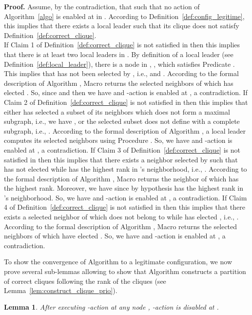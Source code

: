 \documentclass[11pt,letterpaper,onecolumn]{article}
\newtheorem{lemma}{Lemma}
\newenvironment{proof}{\noindent \begin{rm}{\textbf{Proof.} }}{\hspace*{\fill}\par\end{rm} \vspace{.3cm}}
\begin{document}
\begin{proof}
Assume, by the contradiction, that  such that  no action of Algorithm~\ref{algo} is enabled at  in . According to Definition~\ref{def:config_legitime}, this implies that there exists a local leader  such that its clique  does not satisfy Definition~\ref{def:correct_clique}.\\
If Claim 1 of Definition~\ref{def:correct_clique} is not satisfied in  then this implies that there is at least two local leaders in . By definition of a local leader (see Definition~\ref{def:local_leader}), there is a node  in , , which satisfies Predicate . This implies that  has not been selected by , i.e.,  and . According to the formal description of Algorithm , Macro  returns the selected neighbors of  which has elected . So, since  and  then we have  and -action is enabled at , a contradiction. If Claim 2 of Definition~\ref{def:correct_clique} is not satisfied in  then this implies that either  has selected a subset of its neighbors  which does not form a maximal subgraph, i.e., we have , or the selected subset  does not define with  a complete subgraph, i.e., . According to the formal description of Algorithm , a local leader computes its selected neighbors using Procedure . So, we have  and -action is enabled at , a contradiction. If Claim 3 of Definition~\ref{def:correct_clique} is not satisfied in  then this implies that there exists a neighbor  selected by  such that  has not elected  while  has the highest rank in 's neighborhood, i.e., . According to the formal description of Algorithm , Macro  returns the neighbor of  which has the highest rank. Moreover, we have  since by hypothesis  has the highest rank in 's neighborhood. So, we have  and -action is enabled at , a contradiction. If Claim 4 of Definition~\ref{def:correct_clique} is not satisfied in  then this implies that there exists a selected neighbor  of  which does not belong to  while  has elected , i.e., . According to the formal description of Algorithm , Macro  returns the selected neighbors of  which have elected . So, we have  and -action is enabled at , a contradiction.
\end{proof}

To show the convergence of Algorithm  to a legitimate configuration, we now prove several sub-lemmas allowing to show that Algorithm  constructs a partition of correct cliques following the rank of the cliques (see Lemma~\ref{lem:construct_clique_prio}).

\begin{lemma}
\label{lem:N-action}
After executing -action at any node , -action is disabled at .
\end{lemma}
\end{document}
